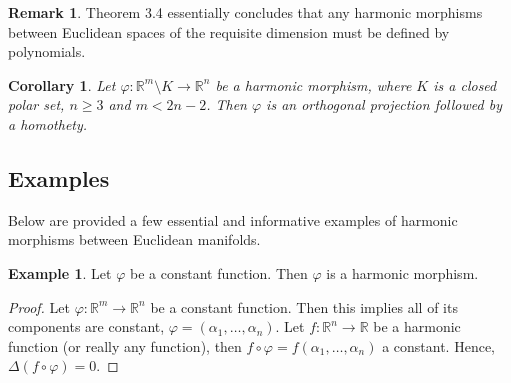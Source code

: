 \documentclass[12pt]{article}
\newtheorem{corollary}{Corollary}[theorem]
\theoremstyle{definition}
\newtheorem{example}{Example}[subsection]
\newtheorem{remark}{Remark}[subsection]
\numberwithin{equation}{subsection}
\begin{document}
\begin{remark}
Theorem 3.4 essentially concludes that any harmonic morphisms between Euclidean spaces of the requisite dimension must be defined by polynomials.
\end{remark}

\begin{corollary}
Let $\varphi: \mathbb{R}^m \setminus K \rightarrow \mathbb{R}^n$ be a harmonic morphism, where $K$ is a closed polar set, $n\geq 3$ and $m < 2n-2$. Then $\varphi$ is an orthogonal projection followed by a homothety.
\end{corollary}
\subsection{Examples}
Below are provided a few essential and informative examples of harmonic morphisms between Euclidean manifolds. 
\begin{example}
Let $\varphi$ be a constant function. Then $\varphi$ is a harmonic morphism.
\begin{proof}
Let $\varphi:\mathbb{R}^m \rightarrow \mathbb{R}^n$ be a constant function. Then this implies all of its components are constant, $\varphi = (\alpha_1, \dots, \alpha_n)$. Let $f: \mathbb{R}^n \rightarrow \mathbb{R}$ be a harmonic function (or really any function), then $f \circ \varphi  = f(\alpha_1 , \dots, \alpha_n)$ a constant. Hence, $\Delta (f \circ \varphi) = 0. $
\end{proof}
\end{example}
\end{document}
